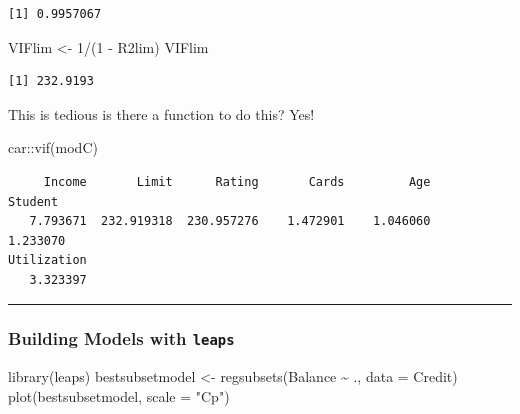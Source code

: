 \documentclass[
]{article}
\newenvironment{Shaded}{\begin{snugshade}}{\end{snugshade}}
\newcommand{\AttributeTok}[1]{\textcolor[rgb]{0.77,0.63,0.00}{#1}}
\newcommand{\DecValTok}[1]{\textcolor[rgb]{0.00,0.00,0.81}{#1}}
\newcommand{\FunctionTok}[1]{\textcolor[rgb]{0.00,0.00,0.00}{#1}}
\newcommand{\NormalTok}[1]{#1}
\newcommand{\OtherTok}[1]{\textcolor[rgb]{0.56,0.35,0.01}{#1}}
\newcommand{\SpecialCharTok}[1]{\textcolor[rgb]{0.00,0.00,0.00}{#1}}
\newcommand{\StringTok}[1]{\textcolor[rgb]{0.31,0.60,0.02}{#1}}
\begin{document}
\begin{verbatim}
[1] 0.9957067
\end{verbatim}

\begin{Shaded}
\begin{Highlighting}[]
\NormalTok{VIFlim }\OtherTok{\textless{}{-}} \DecValTok{1}\SpecialCharTok{/}\NormalTok{(}\DecValTok{1} \SpecialCharTok{{-}}\NormalTok{ R2lim)}
\NormalTok{VIFlim}
\end{Highlighting}
\end{Shaded}

\begin{verbatim}
[1] 232.9193
\end{verbatim}

This is tedious is there a function to do this? Yes!

\begin{Shaded}
\begin{Highlighting}[]
\NormalTok{car}\SpecialCharTok{::}\FunctionTok{vif}\NormalTok{(modC)}
\end{Highlighting}
\end{Shaded}

\begin{verbatim}
     Income       Limit      Rating       Cards         Age     Student 
   7.793671  232.919318  230.957276    1.472901    1.046060    1.233070 
Utilization 
   3.323397 
\end{verbatim}

\begin{center}\rule{0.5\linewidth}{0.5pt}\end{center}

\hypertarget{building-models-with-leaps}{%
\subsubsection{\texorpdfstring{Building Models with \texttt{leaps}}{Building Models with leaps}}\label{building-models-with-leaps}}

\begin{Shaded}
\begin{Highlighting}[]
\FunctionTok{library}\NormalTok{(leaps)}
\NormalTok{bestsubsetmodel }\OtherTok{\textless{}{-}} \FunctionTok{regsubsets}\NormalTok{(Balance }\SpecialCharTok{\textasciitilde{}}\NormalTok{ ., }\AttributeTok{data =}\NormalTok{ Credit)}
\FunctionTok{plot}\NormalTok{(bestsubsetmodel, }\AttributeTok{scale =} \StringTok{"Cp"}\NormalTok{)}
\end{Highlighting}
\end{Shaded}
\end{document}
